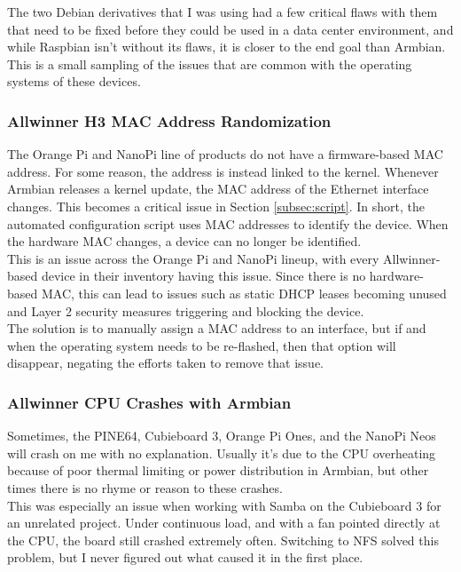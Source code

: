 \documentclass[12pt]{spieman}  %
\begin{document}
The two Debian derivatives that I was using had a few critical flaws with them that need to be fixed before they could be used in a data center environment, and while Raspbian isn’t without its flaws, it is closer to the end goal than Armbian. This is a small sampling of the issues that are common with the operating systems of these devices.

\subsubsection{Allwinner H3 MAC Address Randomization}
\label{subsubsec:allwinner-mac}

The Orange Pi and NanoPi line of products do not have a firmware-based MAC address. For some reason, the address is instead linked to the kernel. Whenever Armbian releases a kernel update, the MAC address of the Ethernet interface changes. This becomes a critical issue in Section \ref{subsec:script}. In short, the automated configuration script uses MAC addresses to identify the device. When the hardware MAC changes, a device can no longer be identified.\\

This is an issue across the Orange Pi and NanoPi lineup, with every Allwinner-based device in their inventory having this issue. Since there is no hardware-based MAC, this can lead to issues such as static DHCP leases becoming unused and Layer 2 security measures triggering and blocking the device.\\

The solution is to manually assign a MAC address to an interface, but if and when the operating system needs to be re-flashed, then that option will disappear, negating the efforts taken to remove that issue.

\subsubsection{Allwinner CPU Crashes with Armbian}
\label{subsubsec:allwinner-crash}

Sometimes, the PINE64, Cubieboard 3, Orange Pi Ones, and the NanoPi Neos will crash on me with no explanation. Usually it’s due to the CPU overheating because of poor thermal limiting or power distribution in Armbian, but other times there is no rhyme or reason to these crashes.\\

This was especially an issue when working with Samba on the Cubieboard 3 for an unrelated project. Under continuous load, and with a fan pointed directly at the CPU, the board still crashed extremely often. Switching to NFS solved this problem, but I never figured out what caused it in the first place.\\
\end{document}
